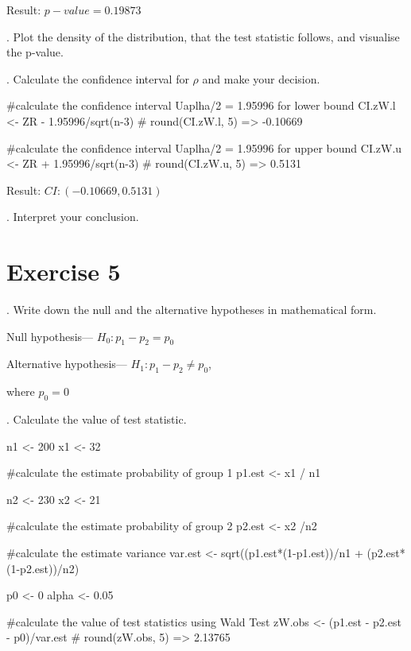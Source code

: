 \documentclass[12pt, oneside]{report}\usepackage[]{graphicx}\usepackage[]{color}
\begin{document}
Result: $p-value = 0.19873$ \newline

. Plot the density of the distribution, that the test statistic follows, and visualise the p-value.


. Calculate the confidence interval for $\rho$ and make your decision.
\begin{Schunk}
\begin{Sinput}
#calculate the confidence interval Uaplha/2 = 1.95996 for lower bound
CI.zW.l <- ZR - 1.95996/sqrt(n-3)
# round(CI.zW.l, 5) => -0.10669

#calculate the confidence interval Uaplha/2 = 1.95996 for upper bound
CI.zW.u <- ZR + 1.95996/sqrt(n-3)
# round(CI.zW.u, 5) => 0.5131
\end{Sinput}
\end{Schunk}

Result: $CI: (-0.10669, 0.5131)$ \newline

. Interpret your conclusion.


\section*{Exercise 5}
. Write down the null and the alternative hypotheses in mathematical form. \newline

Null hypothesis— $H_0: p_1 - p_2 = p_0$ \newline

Alternative hypothesis— $H_1: p_1 - p_2 \neq p_0$, \newline

where $p_0 = 0$\newline

. Calculate the value of test statistic.
\begin{Schunk}
\begin{Sinput}
n1 <- 200
x1 <- 32

#calculate the estimate probability of group 1
p1.est <- x1 / n1

n2 <- 230
x2 <- 21

#calculate the estimate probability of group 2
p2.est <- x2 /n2

#calculate the estimate variance
var.est <- sqrt((p1.est*(1-p1.est))/n1 + (p2.est*(1-p2.est))/n2)

p0 <- 0
alpha <- 0.05

#calculate the value of test statistics using Wald Test
zW.obs <- (p1.est - p2.est - p0)/var.est
# round(zW.obs, 5) => 2.13765
\end{Sinput}
\end{Schunk}
\end{document}
